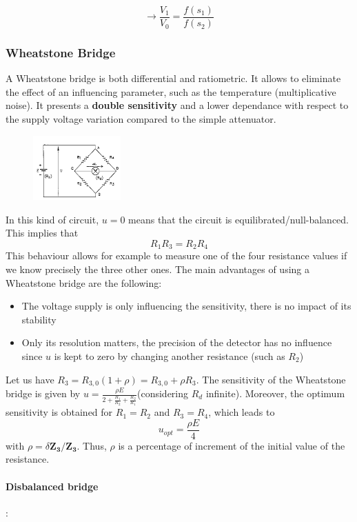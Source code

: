 $$\rightarrow \frac{V_1}{V_0} = \frac{f(s_1)}{f(s_2)}$$

\subsubsection{Wheatstone Bridge}

A Wheatstone bridge is both differential and ratiometric. It allows to eliminate the effect of an influencing parameter, such
as the temperature (multiplicative noise). It presents a \textbf{double sensitivity} and a lower dependance with respect to the
supply voltage variation compared to the simple attenuator.
\begin{figure}[H]
    \centering
    \includegraphics[width = 0.3\textwidth]{L4/img/wheatstone.PNG}
\end{figure}
In this kind of circuit, $u=0$ means that the circuit is equilibrated/null-balanced. This implies that 
$$ R_1 R_3 = R_2 R_4 $$ 
This behaviour allows for example to measure one of the four resistance values if we know precisely the three other ones.
The main advantages of using a Wheatstone bridge are the following:
\begin{itemize}
    \item The voltage supply is only influencing the sensitivity, there is no impact of
its stability
    \item Only its resolution matters, the precision of the detector has no influence since $u$ is kept to zero by changing another resistance (such as $R_2$) 
\end{itemize}
Let us have $ R_3 = R_{3,0} (1+\rho) = R_{3,0} + \rho R_3$. The sensitivity of the Wheatstone bridge is given by $u = \frac{\rho E}{2 + \frac{R_1}{R_2} + \frac{R_2}{R_1}}$(considering $R_d$ infinite). Moreover, the optimum sensitivity is obtained for $R_1=R_2$ and $R_3=R_4$, which leads to $$ u_{opt} = \frac{\rho E}{4} $$ with $\rho = \delta \mathbf{Z_3}/\mathbf{Z_3}$. Thus, $\rho$ is a percentage of increment of the initial value of the resistance. 

\paragraph{Disbalanced bridge}:

